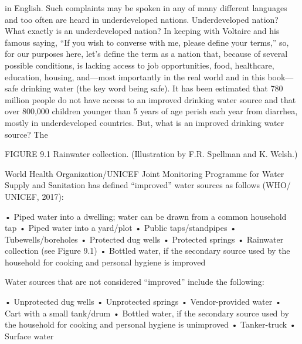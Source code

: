 \documentclass{article}
\begin{document}
in English. Such complaints may be spoken in any of many different
languages and too often are heard in underdeveloped nations.
Underdeveloped nation? What exactly is an underdeveloped nation? In
keeping with Voltaire and his famous saying, ``If you wish to converse
with me, please define your terms,'' so, for our purposes here, let's
define the term as a nation that, because of several possible
conditions, is lacking access to job opportunities, food, healthcare,
education, housing, and---most importantly in the real world and in this
book---safe drinking water (the key word being safe). It has been
estimated that 780 million people do not have access to an improved
drinking water source and that over 800,000 children younger than 5
years of age perish each year from diarrhea, mostly in underdeveloped
countries. But, what is an improved drinking water source? The

FIGURE 9.1 Rainwater collection. (Illustration by F.R. Spellman and K.
Welsh.)

World Health Organization/UNICEF Joint Monitoring Programme for Water
Supply and Sanitation has defined ``improved'' water sources as follows
(WHO/ UNICEF, 2017):

• Piped water into a dwelling; water can be drawn from a common
household tap • Piped water into a yard/plot • Public taps/standpipes •
Tubewells/boreholes • Protected dug wells • Protected springs •
Rainwater collection (see Figure 9.1) • Bottled water, if the secondary
source used by the household for cooking and personal hygiene is
improved

Water sources that are not considered ``improved'' include the
following:

• Unprotected dug wells • Unprotected springs • Vendor-provided water •
Cart with a small tank/drum • Bottled water, if the secondary source
used by the household for cooking and personal hygiene is unimproved •
Tanker-truck • Surface water
\end{document}
